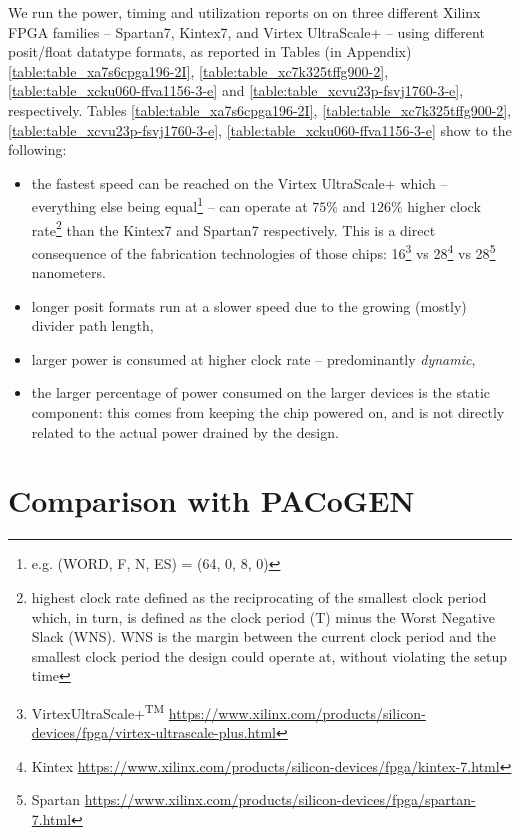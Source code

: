 We run the power, timing and utilization reports on on three different Xilinx FPGA families -- Spartan7, Kintex7, and Virtex UltraScale+ -- using different posit/float datatype formats, as reported in Tables (in Appendix) \ref{table:table_xa7s6cpga196-2I}, \ref{table:table_xc7k325tffg900-2}, \ref{table:table_xcku060-ffva1156-3-e} and \ref{table:table_xcvu23p-fsvj1760-3-e}, respectively.
Tables \ref{table:table_xa7s6cpga196-2I}, \ref{table:table_xc7k325tffg900-2}, \ref{table:table_xcvu23p-fsvj1760-3-e}, \ref{table:table_xcku060-ffva1156-3-e} show  to the following:
\begin{itemize}
    \item the fastest speed can be reached on the Virtex UltraScale+ which -- everything else being equal\footnote{e.g. (WORD, F, N, ES) = (64, 0, 8, 0)} -- can operate at $75 \%$ and $126 \%$ higher clock rate\footnote{highest clock rate defined as the reciprocating of the smallest clock period which, in turn, is defined as the clock period (T) minus the Worst Negative Slack (WNS). WNS is the margin between the current clock period and the smallest clock period the design could operate at, without violating the setup time} than the Kintex7 and Spartan7 respectively. This is a direct consequence of the fabrication technologies of those chips: 16\footnote{Virtex\textregistered UltraScale+\textsuperscript{TM} \url{https://www.xilinx.com/products/silicon-devices/fpga/virtex-ultrascale-plus.html}} vs 28\footnote{Kintex \url{https://www.xilinx.com/products/silicon-devices/fpga/kintex-7.html}} vs 28\footnote{Spartan \url{https://www.xilinx.com/products/silicon-devices/fpga/spartan-7.html}} nanometers.
    \item longer posit formats run at a slower speed due to the growing (mostly) divider path length,
    \item larger power is consumed at higher clock rate -- predominantly \textit{dynamic},
    \item the larger percentage of power consumed on the larger devices is the static component: this comes from keeping the chip powered on, and is not directly related to the actual power drained by the design.
\end{itemize}



\section{Comparison with PACoGEN}

